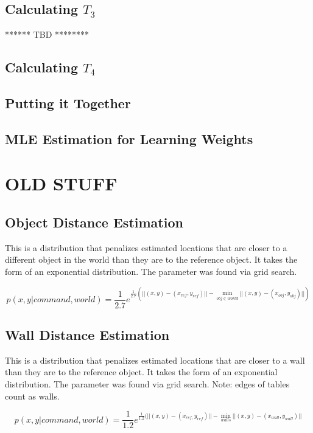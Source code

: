 \documentclass[12pt,letterpaper]{article}
\begin{document}
\subsection{Calculating $T_3$}
****** TBD ********

\subsection{Calculating $T_4$}

\subsection{Putting it Together}

\subsection{MLE Estimation for Learning Weights}

\section*{OLD STUFF}

\subsection{Object Distance Estimation}
This is a distribution that penalizes estimated locations that are closer to a different object in the world than they are to the reference object. It takes the form of an exponential distribution. The parameter was found via grid search.

\[
p(x, y | command, world) = \frac{1}{2.7}e^{\frac{1}{2.7}(||(x, y) - (x_{ref}, y_{ref})|| - \min_{obj \in world} ||(x, y) - (x_{obj}, y_{obj})||)}
\]
\newpage
\subsection{Wall Distance Estimation}
This is a distribution that penalizes estimated locations that are closer to a wall than they are to the reference object. It takes the form of an exponential distribution. The parameter was found via grid search. Note: edges of tables count as walls.

\[
p(x, y | command, world) = \frac{1}{1.2}e^{\frac{1}{1.2}(||(x, y) - (x_{ref,} y_{ref})|| - \min_{walls} ||(x, y) - (x_{wall}, y_{wall})||}
\]
\end{document}
